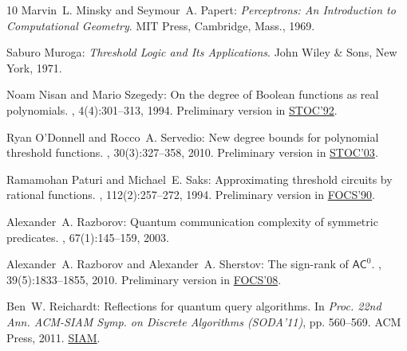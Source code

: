\begin{thebibliography}{10}
{\sc Marvin~L. Minsky and Seymour~A. Papert}: {\em Perceptrons: {A}n
  Introduction to Computational Geometry}.
\newblock MIT Press, Cambridge, Mass., 1969.

{\sc Saburo Muroga}: {\em Threshold Logic and Its Applications}.
\newblock John Wiley \& Sons, New York, 1971.

{\sc Noam Nisan and Mario Szegedy}: On the degree of {B}oolean functions as
  real polynomials.
, 4(4):301--313, 1994.
\newblock Preliminary version in
  \href{http://dx.doi.org/10.1145/129712.129757}{STOC'92}.
\newblock [\epfmtdoi{10.1007/BF01263419}]

{\sc Ryan O'Donnell and Rocco~A. Servedio}: New degree bounds for polynomial
  threshold functions.
, 30(3):327--358, 2010.
\newblock Preliminary version in
  \href{http://dx.doi.org/10.1145/780542.780592}{STOC'03}.
\newblock [\epfmtdoi{10.1007/s00493-010-2173-3}]

{\sc Ramamohan Paturi and Michael~E. Saks}: Approximating threshold circuits by
  rational functions.
, 112(2):257--272, 1994.
\newblock Preliminary version in
  \href{http://dx.doi.org/10.1109/FSCS.1990.89559}{FOCS'90}.

{\sc Alexander~A. Razborov}: Quantum communication complexity of symmetric
  predicates.
, 67(1):145--159, 2003.

{\sc Alexander~A. Razborov and Alexander~A. Sherstov}: The sign-rank of
  {$\mathsf{AC}^0$}.
, 39(5):1833--1855, 2010.
\newblock Preliminary version in
  \href{http://dx.doi.org/10.1109/FOCS.2008.19}{FOCS'08}.
\newblock [\epfmtdoi{10.1137/080744037}]

{\sc Ben~W. Reichardt}: Reflections for quantum query algorithms.
\newblock In {\em Proc. 22nd Ann. ACM-SIAM Symp. on Discrete Algorithms
  (SODA'11)}, pp. 560--569. ACM Press, 2011.
\newblock
  \href{https://www.siam.org/proceedings/soda/2011/SODA11_044_reichardtb.pdf}{SIAM}.


\end{thebibliography}
